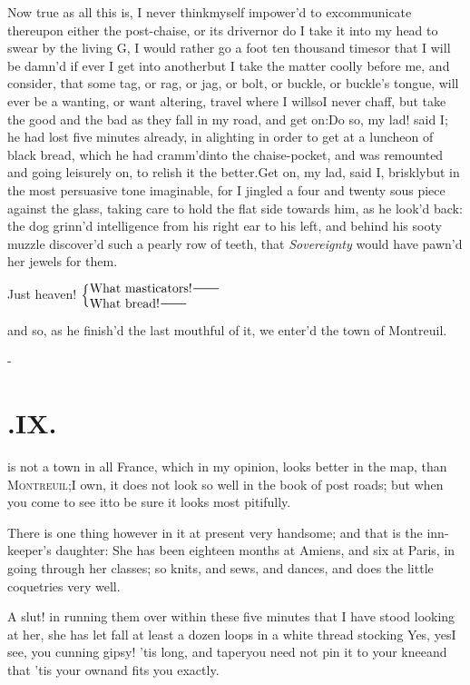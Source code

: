 \documentclass{article}
\begin{document}
Now true as all this is, I never think\break myself impower’d to
excommunicate thereupon either the post-chaise, or its
driver\tsh nor do I take it into my head to swear by the
living G\tsk, I would rather go a foot ten thousand
times\tsh or that I will be damn’d if ever I get
into another\tsh but I take the matter coolly
before me, and consider, that some tag, or rag, or jag, or bolt, or
buckle, or buckle’s tongue, will ever be a wanting, or want
altering, travel where I will\tsk so\break I never chaff, but take the
good and the bad as they fall in my road, and get
on:\tsh Do so, my lad! said I; he had lost five minutes
already, in alighting in order to get at a luncheon of black bread,
which he had cramm’d\break into the chaise-pocket, and was
remounted and going leisurely on, to relish it the
better.\tsh Get on, my lad, said I, briskly\tsk but in
the most persuasive tone imaginable, for I jingled a
four and twenty sous piece against the glass, taking care to hold
the flat side towards him, as he look’d back: the dog
grinn’d intelligence from his right ear to his left, and
behind his sooty muzzle discover’d such a pearly row of teeth, that
\textit{Sovereignty} would have pawn’d her jewels for
them.\tsh

\noindent
Just heaven! $\Big\{\vcenter{\halign{#\hss\cr What masticators!\tsh\cr What bread!\tsh\cr}}$

\noindent
and so, as he finish’d the last mouthful of it, we
enter’d the town of Montreuil.

\vfill{}\eject
\null\kern-\baselineskip
\section{.\enspace IX.}

 is not a town in all France, which in my opinion, looks better in the
map, than \textsc{Montreuil};\tsh I own, it does not look so well in the book of
post roads; but when you come to see it\tsk to be sure it looks most pitifully.

There is one thing however in it at present very handsome; and that is the
inn-keeper’s daughter: She has been eighteen months at Amiens, and six at
Paris, in going through her classes; so knits, and sews, and dances, and
does the little coquetries very well.\tsh

\tsk A slut! in running them over with\-in these five minutes
that I have stood looking at her, she has let fall at least a dozen
loops in a white thread stocking\break
\tsh Yes, yes\tsk I see, you cunning gipsy!\break
\tsk ’tis long, and taper\tsk you need
not pin it to your knee\tsk and that ’tis your
own\tsk and fits you exactly.\tsh
\end{document}
